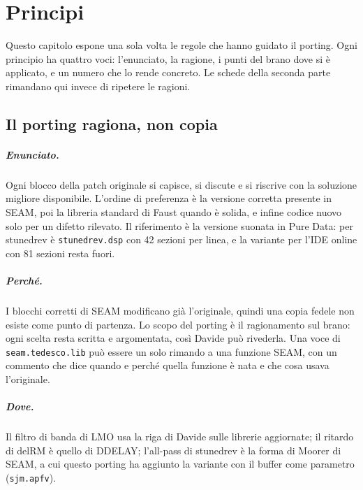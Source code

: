 \chapter{Principi}\label{cap:principi}
Questo capitolo espone una sola volta le regole che hanno guidato il porting.
Ogni principio ha quattro voci: l'enunciato, la ragione, i punti del brano dove si è applicato, e un numero che lo rende concreto.
Le schede della seconda parte rimandano qui invece di ripetere le ragioni.

\section{Il porting ragiona, non copia}\label{sec:principio-ragiona}
\paragraph{Enunciato.}
Ogni blocco della patch originale si capisce, si discute e si riscrive con la soluzione migliore disponibile.
L'ordine di preferenza è la versione corretta presente in SEAM, poi la libreria standard di Faust quando è solida, e infine codice nuovo solo per un difetto rilevato.
Il riferimento è la versione suonata in Pure Data: per stunedrev è \texttt{stunedrev.dsp} con 42 sezioni per linea, e la variante per l'IDE online con 81 sezioni resta fuori.

\paragraph{Perché.}
I blocchi corretti di SEAM modificano già l'originale, quindi una copia fedele non esiste come punto di partenza.
Lo scopo del porting è il ragionamento sul brano: ogni scelta resta scritta e argomentata, così Davide può rivederla.
Una voce di \texttt{seam.tedesco.lib} può essere un solo rimando a una funzione SEAM, con un commento che dice quando e perché quella funzione è nata e che cosa usava l'originale.

\paragraph{Dove.}
Il filtro di banda di LMO usa la riga di Davide sulle librerie aggiornate; il ritardo di delRM è quello di DDELAY; l'all-pass di stunedrev è la forma di Moorer di SEAM, a cui questo porting ha aggiunto la variante con il buffer come parametro (\texttt{sjm.apfv}).

